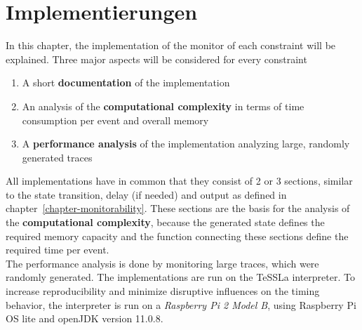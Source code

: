 
\chapter{Implementierungen}
\label{chapter-implementation}

	In this chapter, the implementation of the monitor of each constraint will be explained. Three major aspects will be considered for every constraint
	\begin{enumerate}[1.]
		\item
			A short \textbf{documentation} of the implementation
		\item
			An analysis of the \textbf{computational complexity} in terms of time consumption per event and overall memory
		\item
			A \textbf{performance analysis} of the implementation analyzing large, randomly generated traces
	\end{enumerate}

	 All implementations have in common that they consist of 2 or 3 sections, similar to the state transition, delay (if needed) and output as defined in chapter~\ref{chapter-monitorability}. These sections are the basis for the analysis of the \textbf{computational complexity}, because the generated state defines the required memory capacity and the function connecting these sections define the required time per event.\\
	 The performance analysis is done by monitoring large traces, which were randomly generated. The implementations are run on the TeSSLa interpreter. To increase reproducibility and minimize disruptive influences on the timing behavior, the interpreter is run on a \emph{Raspberry Pi 2 Model B}, using Raspberry Pi OS lite and openJDK version 11.0.8.
	 
